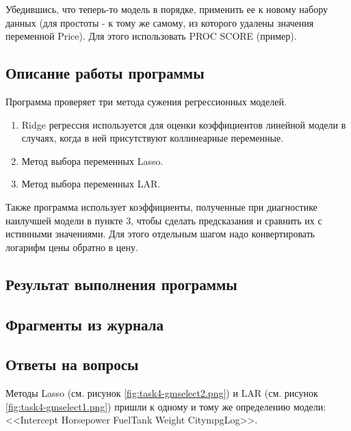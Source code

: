 \documentclass[12pt,a4paper]{article}
\begin{document}
  Убедившись, что теперь-то модель в порядке, применить ее к новому набору данных
  (для простоты - к тому же самому, из которого удалены значения переменной Price).
  Для этого использовать PROC SCORE (пример).

  \subsection{Описание работы программы}
  Программа проверяет три метода сужения регрессионных моделей.
  \begin{enumerate}
    \item Ridge регрессия используется для оценки коэффициентов линейной модели в случаях, когда в ней присутствуют коллинеарные переменные.
    \item Метод выбора переменных Lasso.
    \item Метод выбора переменных LAR.
  \end{enumerate}

  Также программа использует коэффициенты, полученные при диагностике наилучшей модели в пункте 3,
  чтобы сделать предсказания и сравнить их с истинными значениями.
  Для этого отдельным шагом надо конвертировать логарифм цены обратно в цену.

  \subsection{Результат выполнения программы}

  \subsection{Фрагменты из журнала}

  \subsection{Ответы на вопросы}
  Методы Lasso (см. рисунок \ref{fig:task4-gmselect2.png}) и LAR (см. рисунок \ref{fig:task4-gmselect1.png})
  пришли к одному и тому же определению модели: <<Intercept Horsepower FuelTank Weight CitympgLog>>.
\end{document}
